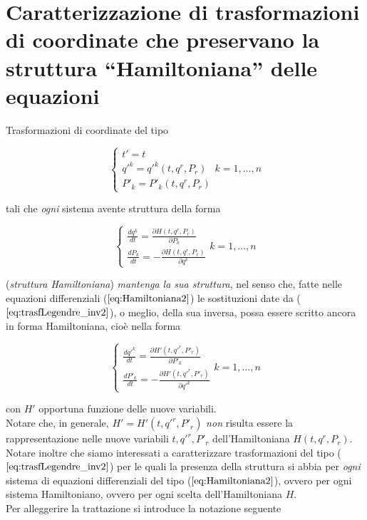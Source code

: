 \section{Caratterizzazione di trasformazioni di coordinate che preservano la struttura ``Hamiltoniana'' delle equazioni}
\setcounter{equation}{0}

Trasformazioni di coordinate del tipo

\begin{equation} \label{eq:trasfLegendre_inv2}
  \begin{cases}
    t' = t \\ q'^k = q'^k (t, q^r, P_r) \\ P'_k = P'_k (t, q^r, P_r)
  \end{cases}
  k = 1, \dots,n
\end{equation}

tali che \textit{ogni} sistema avente struttura della forma

\begin{equation} \label{eq:Hamiltoniana2}
  \begin{cases}
    \frac{d q^k}{d t} = \frac{\partial H (t, q^r, P_r)}{\partial P_k}\\
    \frac{d P_k}{d t} = - \frac{\partial H (t, q^r, P_r)}{\partial q^k}
  \end{cases}
  k = 1, \dots, n
\end{equation}

(\textit{struttura Hamiltoniana})\textit{ mantenga la sua struttura}, nel senso che, fatte nelle equazioni differenziali ($ \ref{eq:Hamiltoniana2} $) le sostituzioni date da ($ \ref{eq:trasfLegendre_inv2} $), o meglio, della sua inversa, possa essere scritto ancora in forma Hamiltoniana, cioè nella forma

\begin{equation} \label{eq:Hamiltoniana'2} %
  \begin{cases}
    \frac{d q'^k}{d t} = \frac{\partial H' (t, q'^r, P'_r)}{\partial P'_k}\\
    \frac{d P'_k}{d t} = - \frac{\partial H' (t, q'^r, P'_r)}{\partial q'^k}
  \end{cases}
  k = 1, \dots, n
\end{equation}

con $ H' $ opportuna funzione delle nuove variabili.\\
Notare che, in generale, $ H' = H' (t, q'^r, P'_r) $ \textit{non} risulta essere la rappresentazione nelle nuove variabili $ t, q'^r, P'_r $ dell'Hamiltoniana $ H (t, q^r, P_r) $.\\
Notare inoltre che siamo interessati a caratterizzare trasformazioni del tipo ($\ref{eq:trasfLegendre_inv2}$) per le quali la presenza della struttura si abbia per \textit{ogni} sistema di equazioni differenziali del tipo ($\ref{eq:Hamiltoniana2}$), ovvero per ogni sistema Hamiltoniano, ovvero per ogni scelta dell'Hamiltoniana $ H $.\\
Per alleggerire la trattazione si introduce la notazione seguente


